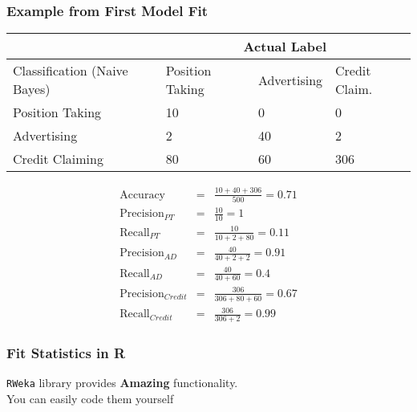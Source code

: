 \documentclass{beamer}
\begin{document}
\begin{frame}
\frametitle{Example from First Model Fit} 



\begin{tabular}{l|lll}
 & \multicolumn{3}{c}{Actual Label} \\
 \hline
Classification (Naive Bayes) & Position Taking & Advertising & Credit Claim. \\ 
Position Taking   &    10  &   0  &   0 \\
Advertising   & 2  & 40  &  2 \\
Credit Claiming   &   80 & 60 & 306\\
\hline\hline
\end{tabular}

\footnotesize
\begin{eqnarray}
\text{Accuracy} & = & \frac{10 + 40 + 306} {500}  = 0.71 \nonumber  \\
\text{Precision}_{PT} & = & \frac{10}{10}  = 1 \nonumber \\
\text{Recall}_{PT} & = & \frac{10}{10 + 2 + 80 }  = 0.11 \nonumber \\
\text{Precision}_{AD} & = & \frac{40}{40 + 2 + 2}  = 0.91 \nonumber \\
\text{Recall}_{AD} & = & \frac{40}{40 + 60 }  = 0.4 \nonumber \\
\text{Precision}_{Credit} & = & \frac{306}{306  + 80 + 60 } = 0.67 \nonumber  \\
\text{Recall}_{Credit} & = & \frac{306}{306 + 2}  = 0.99 \nonumber 
\end{eqnarray}

\end{frame}




\begin{frame}
\frametitle{Fit Statistics in R} 

{\tt RWeka} library provides \textbf{Amazing} functionality.\\
You can easily code them yourself
\end{frame}
\end{document}
